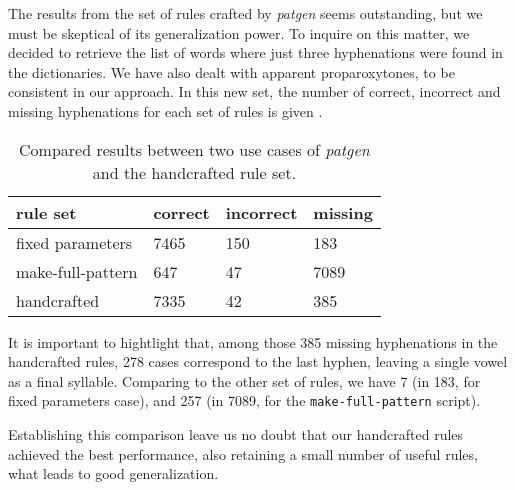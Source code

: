 %
%


The results from the set of rules crafted by \emph{patgen} seems outstanding, but we must be 
skeptical of its generalization power. To inquire on this matter, we decided to retrieve the
list of words where just three hyphenations were found in the dictionaries. We have also dealt
with apparent proparoxytones, to be consistent in our approach.  
In this new set, the number of correct, incorrect and missing hyphenations for each set of rules
is given .
\begin{table}[h]
\centering
\caption{Compared results between two use cases of \emph{patgen} and the handcrafted rule set.}\label{tbl-comres-hy3}
\begin{tabular}{llll}
rule set          & correct & incorrect & missing \\
\hline
fixed parameters  & 7465    & 150       & 183 \\
make-full-pattern & 647     & 47        & 7089 \\
handcrafted       & 7335    & 42        & 385 
\end{tabular}
\end{table}
It is important to hightlight that, among those 385 missing hyphenations in the handcrafted rules,
278 cases correspond to the last hyphen, leaving a single vowel as a final syllable.
Comparing to the other set of rules, we have 7 (in 183, for fixed parameters case), and 257 (in 7089, 
for the \texttt{make-full-pattern} script).

Establishing this comparison leave us no doubt that our handcrafted rules achieved the best
performance, also retaining a small number of useful rules, what leads to good generalization.




